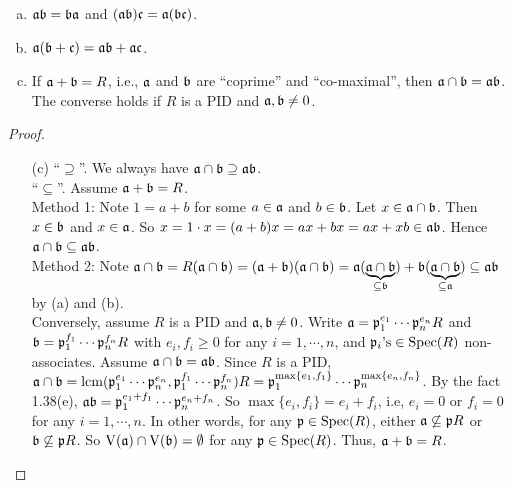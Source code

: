 \begin{proposition}
    \begin{enumerate}[(a)]
        \item $\mathfrak{a} \mathfrak{b} = \mathfrak{b} \mathfrak{a}$ and $(\mathfrak{a} \mathfrak{b})\mathfrak{c} = \mathfrak{a}(\mathfrak{b}\mathfrak{c})$.
        \item $\mathfrak{a}(\mathfrak{b} + \mathfrak{c}) = \mathfrak{a} \mathfrak{b} + \mathfrak{a} \mathfrak{c}$.
        \item If $\mathfrak{a} + \mathfrak{b} = R$, i.e., $\mathfrak{a}$ and $\mathfrak{b}$ are ``coprime'' and ``co-maximal'', then $\mathfrak{a} \cap \mathfrak{b} = \mathfrak{a} \mathfrak{b}$. \\
            The converse holds if $R$ is a PID and $\mathfrak{a},\mathfrak{b} \neq 0$.
    \end{enumerate}
\end{proposition}

\begin{proof}
    \begin{enumerate}
        \item [(c)]
            ``$\supseteq$''. We always have $\mathfrak{a} \cap \mathfrak{b} \supseteq \mathfrak{a} \mathfrak{b}$. \\
            ``$\subseteq$''. Assume $\mathfrak{a} + \mathfrak{b} = R$.  \\
            Method 1: Note $1 = a+b$ for some $a \in \mathfrak{a}$ and $b \in \mathfrak{b}$. Let $x \in \mathfrak{a} \cap \mathfrak{b}$. Then $x \in \mathfrak{b}$ and $x \in \mathfrak{a}$. So $x = 1 \cdot x = (a+b)x = ax + bx = ax + xb \in \operatorname{\mathfrak{a} \mathfrak{b}}$. Hence $\mathfrak{a} \cap \mathfrak{b} \subseteq \mathfrak{a} \mathfrak{b}$. \\
            Method 2: Note $\mathfrak{a} \cap \mathfrak{b} = R(\mathfrak{a} \cap \mathfrak{b}) = (\mathfrak{a} + \mathfrak{b})(\mathfrak{a} \cap \mathfrak{b}) = \mathfrak{a}(\underbrace{\mathfrak{a} \cap \mathfrak{b}}_{\subseteq \mathfrak{b}}) + \mathfrak{b}(\underbrace{\mathfrak{a} \cap \mathfrak{b}}_{\subseteq \mathfrak{a}}) \subseteq \mathfrak{a} \mathfrak{b}$ by (a) and (b). \\
            Conversely, assume $R$ is a PID and $\mathfrak{a},\mathfrak{b} \neq 0$. Write $\mathfrak{a} = \mathfrak{p}_1^{e_1} \cdots \mathfrak{p}_n^{e_n} R$ and $\mathfrak{b} = \mathfrak{p}_1^{f_1} \cdots \mathfrak{p}_n^{f_n}R$ with $e_i,f_i \geq 0$ for any $i = 1,\cdots,n$, and $\mathfrak{p}_i\text{'s} \in \operatorname{Spec}(R)$ non-associates. Assume $\mathfrak{a} \cap \mathfrak{b} = \mathfrak{a} \mathfrak{b}$. Since $R$ is a PID, $\mathfrak{a} \cap \mathfrak{b} = \operatorname{lcm}(\mathfrak{p}_1^{e_1} \cdots \mathfrak{p}_n^{e_n},\mathfrak{p}_1^{f_1} \cdots \mathfrak{p}_n^{f_n})R = \mathfrak{p}_1^{\max\{e_1,f_1\}} \cdots \mathfrak{p}_n^{\max\{e_n,f_n\}}$. By the fact 1.38(e), $\mathfrak{a}\mathfrak{b} = \mathfrak{p}_1^{e_1+f_1} \cdots \mathfrak{p}_n^{e_n+f_n}$. So $\max\{e_i,f_i\} = e_i + f_i$, i.e, $e_i = 0$ or $f_i = 0$ for any $i = 1,\cdots,n$. In other words, for any $\mathfrak{p} \in \operatorname{Spec}(R)$, either $\mathfrak{a} \not \subseteq \mathfrak{p} R$ or $\mathfrak{b} \not \subseteq \mathfrak{p} R$. So $\operatorname{V}(\mathfrak{a}) \cap \operatorname{V}(\mathfrak{b}) = \emptyset$ for any $\mathfrak{p} \in \operatorname{Spec}(R)$. Thus, $\mathfrak{a} + \mathfrak{b} = R$.
    \end{enumerate}
\end{proof}

